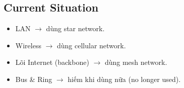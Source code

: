 \subsection{Current Situation}

\begin{itemize}
    \item LAN $\rightarrow$ dùng star network.
    \item Wireless $\rightarrow$ dùng cellular network.
    \item Lõi Internet (backbone) $\rightarrow$ dùng mesh network.
    \item Bus \& Ring $\rightarrow$ hiếm khi dùng nữa (no longer used).
\end{itemize}
